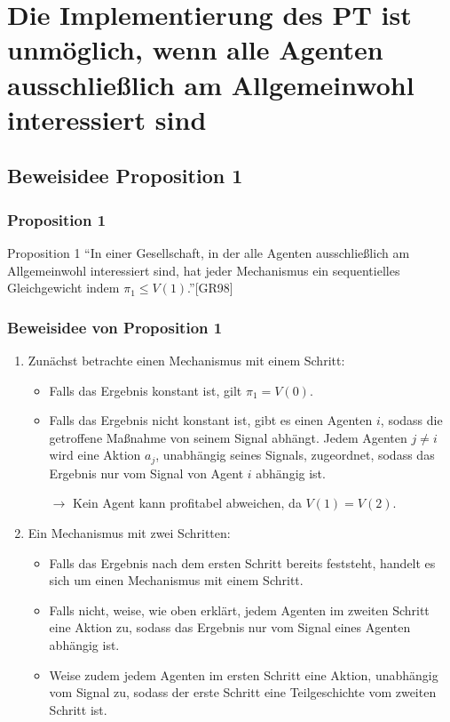 \documentclass{beamer}
\begin{document}
\section[ausschlie{\ss}lich Allgemeinwohl]{Die Implementierung des PT ist unm\"oglich, wenn alle Agenten ausschlie{\ss}lich am Allgemeinwohl interessiert sind} 






\subsection[Proposition 1]{Beweisidee Proposition 1}
\begin{frame}\frametitle{Proposition 1}
\begin{block}{Proposition 1}
``In einer Gesellschaft, in der alle Agenten ausschlie{\ss}lich am Allgemeinwohl interessiert sind, hat jeder Mechanismus ein sequentielles Gleichgewicht indem $\pi_1\leq V(1)$.''[GR98]
\end{block}
\end{frame}



\begin{frame}\frametitle{Beweisidee von Proposition 1}



\begin{enumerate}
\item Zun\"achst betrachte einen Mechanismus mit einem Schritt: 
\begin{itemize}
\item Falls das Ergebnis konstant ist, gilt $\pi_1=V(0)$.
\item Falls das Ergebnis nicht konstant ist, gibt es einen Agenten $i$, sodass die getroffene Ma{\ss}nahme von seinem Signal abh\"angt. Jedem Agenten $j\neq i$ wird eine Aktion $a_j$, unabh\"angig seines Signals, zugeordnet, sodass das Ergebnis nur vom Signal von Agent $i$ abh\"angig ist.
\item[$\rightarrow$] Kein Agent kann profitabel abweichen, da $V(1)=V(2)$.
\end{itemize}
\item Ein Mechanismus mit zwei Schritten:
\begin{itemize}
\item Falls das Ergebnis nach dem ersten Schritt bereits feststeht, handelt es sich um einen Mechanismus mit einem Schritt.
\item Falls nicht, weise, wie oben erkl\"art, jedem Agenten im zweiten Schritt eine Aktion zu, sodass das Ergebnis nur vom Signal eines Agenten abh\"angig ist.
\item Weise zudem jedem Agenten im ersten Schritt eine Aktion, unabh\"angig vom Signal zu, sodass der erste Schritt eine Teilgeschichte vom zweiten Schritt ist.
\end{itemize}
\end{enumerate}
\end{frame}
\end{document}
